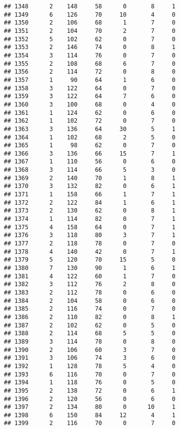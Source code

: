 \documentclass[
]{article}
\begin{document}
\begin{verbatim}
## 1348      2    148     58      0       8     1
## 1349      6    126     70     10       4     0
## 1350      2    106     68      1       7     0
## 1351      2    104     70      2       7     0
## 1352      5    102     62      0       7     0
## 1353      2    146     74      0       8     1
## 1354      3    114     76      0       7     0
## 1355      2    108     68      6       7     0
## 1356      2    114     72      0       8     0
## 1357      1     90     64      1       6     0
## 1358      3    122     64      0       7     0
## 1359      3    122     64      7       6     0
## 1360      3    100     68      0       4     0
## 1361      1    124     62      0       6     0
## 1362      1    102     72      0       7     0
## 1363      3    136     64     30       5     1
## 1364      1    102     68      2       5     0
## 1365      1     98     62      0       7     0
## 1366      3    136     66     15       7     1
## 1367      1    110     56      0       6     0
## 1368      3    114     66      5       3     0
## 1369      2    140     70      1       8     1
## 1370      3    132     82      0       6     1
## 1371      1    158     66      1       7     1
## 1372      2    122     84      1       6     1
## 1373      2    130     62      0       8     1
## 1374      1    114     82      0       7     1
## 1375      4    158     64      0       7     1
## 1376      3    118     80      3       7     1
## 1377      2    118     78      0       7     0
## 1378      4    140     42      0       7     1
## 1379      5    120     70     15       5     0
## 1380      7    130     90      1       6     1
## 1381      4    122     60      1       7     0
## 1382      3    112     76      2       8     0
## 1383      2    112     78      0       6     0
## 1384      2    104     58      0       6     0
## 1385      2    116     74      0       7     0
## 1386      2    110     82      0       8     1
## 1387      2    102     62      0       5     0
## 1388      2    114     68      5       5     0
## 1389      3    114     78      0       8     0
## 1390      2    106     60      3       7     0
## 1391      3    106     74      3       6     0
## 1392      1    128     78      5       4     0
## 1393      6    116     70      0       7     0
## 1394      1    118     76      0       5     0
## 1395      2    138     72      0       6     1
## 1396      2    120     56      0       6     0
## 1397      2    134     80      0      10     1
## 1398      6    150     84     12       4     1
## 1399      2    116     70      0       7     0

\end{verbatim}
\end{document}
